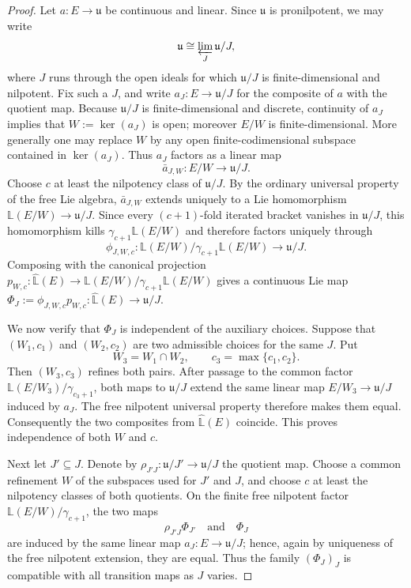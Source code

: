 \documentclass[11pt,a4paper]{article}
\theoremstyle{definition}
\newcommand{\LL}{\widehat{\mathbb L}}
\begin{document}
\begin{proof}
Let $a:E\to\mathfrak u$ be continuous and linear.  Since
$\mathfrak u$ is pronilpotent, we may write
\[
 \mathfrak u\cong\varprojlim_J \mathfrak u/J,
\]
where $J$ runs through the open ideals for which $\mathfrak u/J$ is
finite-dimensional and nilpotent.  Fix such a $J$, and write
$a_J:E\to\mathfrak u/J$ for the composite of $a$ with the quotient map.
Because $\mathfrak u/J$ is finite-dimensional and discrete, continuity of
$a_J$ implies that $W:=\ker(a_J)$ is open; moreover $E/W$ is
finite-dimensional.  More generally one may replace $W$ by any open
finite-codimensional subspace contained in $\ker(a_J)$.  Thus $a_J$
factors as a linear map
\[
 \bar a_{J,W}:E/W\longrightarrow\mathfrak u/J.
\]
Choose $c$ at least the nilpotency class of $\mathfrak u/J$.  By the
ordinary universal property of the free Lie algebra, $\bar a_{J,W}$
extends uniquely to a Lie homomorphism $\mathbb L(E/W)\to\mathfrak u/J$.
Since every $(c+1)$-fold iterated bracket vanishes in $\mathfrak u/J$,
this homomorphism kills $\gamma_{c+1}\mathbb L(E/W)$ and therefore factors
uniquely through
\[
 \phi_{J,W,c}:\mathbb L(E/W)/\gamma_{c+1}\mathbb L(E/W)
       \longrightarrow\mathfrak u/J.
\]
Composing with the canonical projection
$p_{W,c}:\LL(E)\to
\mathbb L(E/W)/\gamma_{c+1}\mathbb L(E/W)$ gives a continuous Lie map
$\Phi_J:=\phi_{J,W,c}p_{W,c}:\LL(E)\to\mathfrak u/J$.

We now verify that $\Phi_J$ is independent of the auxiliary choices.
Suppose that $(W_1,c_1)$ and $(W_2,c_2)$ are two admissible choices for the
same $J$.  Put
\[
 W_3=W_1\cap W_2,\qquad c_3=\max\{c_1,c_2\}.
\]
Then $(W_3,c_3)$ refines both pairs.  After passage to the common factor
$\mathbb L(E/W_3)/\gamma_{c_3+1}$, both maps to $\mathfrak u/J$ extend
the same linear map $E/W_3\to\mathfrak u/J$ induced by $a_J$.
The free nilpotent universal property therefore makes them equal.
Consequently the two composites from $\LL(E)$ coincide.  This proves
independence of both $W$ and $c$.

Next let $J'\subseteq J$.  Denote by
$\rho_{J'J}:\mathfrak u/J'\to\mathfrak u/J$ the quotient map.  Choose a
common refinement $W$ of the subspaces used for $J'$ and $J$, and choose
$c$ at least the nilpotency classes of both quotients.  On the finite free
nilpotent factor $\mathbb L(E/W)/\gamma_{c+1}$, the two maps
\[
 \rho_{J'J}\Phi_{J'}
 \quad\text{and}\quad
 \Phi_J
\]
are induced by the same linear map $a_J:E\to\mathfrak u/J$; hence, again
by uniqueness of the free nilpotent extension, they are equal.  Thus the
family $(\Phi_J)_J$ is compatible with all transition maps as $J$ varies.


\end{proof}
\end{document}
